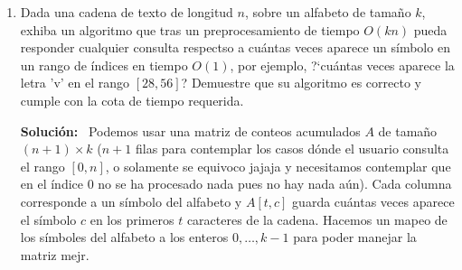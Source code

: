 \documentclass{article}
\newcommand{\Sol}{\textbf{Soluci\'on:} \ }
\begin{document}
\begin{enumerate}
\begin{enumerate}
            \medskip
            \Sol Sí es posible ordenarlo, y usando esta nueva información que sabemos
            podemos usar el algoritmo de CountingSort, que vimos en clase y además tiene la
            característica de que es estable y su tiempo de ejecución es $O(n+k)$ donde $k$ es el rango de los elementos a ordenar, en este caso $k = m$.
            Entonces, si $m \in O(n)$, el tiempo $O(n+k) = O(n+m)$ es absorbido brutalmente por $O(n)$, por lo que podemos decir que sí.

            \item Si $m \in O(n^2)$, ?`es posible ordenar $A$ en tiempo O$(n)$?
            \medskip
            \Sol Aquí si cambia un poco la cosa, que que si intentamos usar Counting, su complejidad
            temporal ahora sería $O(n+m) = O(n+n^2) = O(n^2)$. Pero qué pasa si en este caso usamos
            Raddix sort (también visto en clase) con números escritos en base $n$, entonces el tiempo de ejecución sería $O(d(n+b))$ donde $d$ es
             el número de dígitos y $b$ es la base, en este caso $b = n$. Y como sabemos que $m \in O(n^2)$,
              entonces el número de dígitos $d$ es constante. Y miren a continuación muestro matemáticamente como se representarían :
               si $0 \leq x < n^2$ y $n \geq 2$, escribimos $x = an+c$, donde $a = \lfloor x/n \rfloor$ y $c = x \bmod n$; el cociente y el residuo son sus dos dígitos en base $n$, ambos entre $0$ y $n-1$. Si $m$ supera $n^2$ por un factor constante, pueden necesitarse más dígitos, pero su cantidad sigue siendo constante.
               Entonces el tiempo de ejecución sería $O(d(n+n)) = O(n)$.
            
        \end{enumerate}

    \item Dada una cadena de texto de longitud $n$, sobre un alfabeto de
        tama\~no $k$, exhiba un algoritmo que tras un preprocesamiento de tiempo
        $O(kn)$ pueda responder cualquier consulta respectso a cu\'antas veces
        aparece un s\'imbolo en un rango de \'indices en tiempo $O(1)$, por
        ejemplo, ?`cu\'antas veces aparece la letra 'v' en el rango $[28, 56]$?
        Demuestre que su algoritmo es correcto y cumple con la cota de tiempo
        requerida.

        \medskip
        \Sol Podemos usar una matriz de conteos acumulados $A$ de tama\~no
        $(n+1)\times k$ ($n+1$ filas para contemplar los casos dónde el usuario consulta el rango $[0, n]$, o solamente se equivoco jajaja y necesitamos contemplar que en el índice 0 no se ha procesado nada pues no hay nada aún). Cada columna corresponde a un s\'imbolo del alfabeto
        y $A[t,c]$ guarda cu\'antas veces aparece el s\'imbolo $c$ en los
        primeros $t$ caracteres de la cadena. Hacemos un mapeo de los símboles
        del alfabeto a los enteros $0, \dots, k-1$ para poder manejar la matriz mejr.


\end{enumerate}
\end{document}
